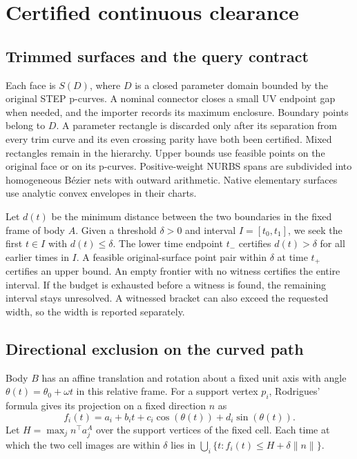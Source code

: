 \section{Certified continuous clearance}
\label{sec:continuous-clearance}

\subsection{Trimmed surfaces and the query contract}

Each face is \(S(D)\), where \(D\) is a closed parameter domain bounded by the
original STEP p-curves. A nominal connector closes a small UV endpoint gap
when needed, and the importer records its maximum enclosure. Boundary points
belong to \(D\). A parameter rectangle is discarded only after its separation
from every trim curve and its even crossing parity have both been certified.
Mixed rectangles remain in the hierarchy. Upper bounds use feasible points
on the original face or on its p-curves. Positive-weight NURBS spans are
subdivided into homogeneous B\'ezier nets with outward arithmetic. Native
elementary surfaces use analytic convex envelopes in their charts.

Let \(d(t)\) be the minimum distance between the two boundaries in the fixed
frame of body \(A\). Given a threshold \(\delta>0\) and interval \(I=[t_0,t_1]\),
we seek the first \(t\in I\) with \(d(t)\leq\delta\).
The lower time endpoint \(t_-\) certifies \(d(t)>\delta\) for all earlier
times in \(I\). A feasible original-surface point pair within \(\delta\)
at time \(t_+\) certifies an upper bound. An empty frontier with no witness
certifies the entire interval. If the budget is exhausted before a witness
is found, the remaining interval stays unresolved. A witnessed bracket can
also exceed the requested width, so the width is reported separately.

\subsection{Directional exclusion on the curved path}

Body \(B\) has an affine translation and rotation about a fixed unit axis
with angle \(\theta(t)=\theta_0+\omega t\) in this relative frame.
For a support vertex \(p_i\), Rodrigues' formula gives its projection
on a fixed direction \(n\) as
\[
f_i(t)=a_i+b_i t+c_i\cos(\theta(t))+d_i\sin(\theta(t)).
\]
Let \(H=\max_j n^\top a_j^A\) over the support vertices of the fixed
cell. Each time at which the two cell images are within \(\delta\) lies in
\(\bigcup_i\{t:f_i(t)\le H+\delta\|n\|\}\).


